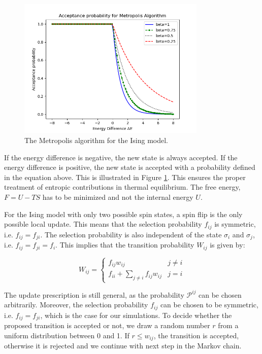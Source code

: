 \begin{figure}
    \centering
    \includegraphics[width=0.8\textwidth]{images/metropolis.png}
    \caption{The Metropolis algorithm for the Ising model.}
    \label{fig:metropolis}
\end{figure}

If the energy difference is negative, the new state is always accepted. If the
energy difference is positive, the new state is accepted with a probability
defined in the equation above. This is illustrated in Figure
\ref{fig:metropolis}. This ensures the proper treatment of entropic
contributions in thermal equilibrium. The free energy, $F = U -TS $ has to be
minimized and not the internal energy $U$.

For the Ising model with only two possible spin states, a spin flip is the only
possible local update. This means that the selection probability \( f_{ij} \) is
symmetric, i.e. \( f_{ij} = f_{ji} \). The selection probability is also
independent of the state \( \sigma_i \) and \( \sigma_j \), i.e. \( f_{ij} =
f_{ji} = f_{i} \). This implies that the transition probability \( W_{ij} \) is
given by:

\begin{equation}
    W_{ij} =
    \begin{cases}
        f_{ij} w_{ij} & j \neq i \\
        f_{ii} + \sum_{j \neq i} f_{ij} w_{ij} & j = i
    \end{cases}
\end{equation}

The update prescription is still general, as the probability \( \mathcal{P}^{ij}
\) can be chosen arbitrarily. Moreover, the selection probability \( f_{ij} \)
can be chosen to be symmetric, i.e. \( f_{ij} = f_{ji} \), which is the case for
our simulations. To decide whether the proposed transition is accepted or not,
we draw a random number \( r \) from a uniform distribution between 0 and 1. If
\( r \leq w_{ij} \), the transition is accepted, otherwise it is rejected and we
continue with next step in the Markov chain.
